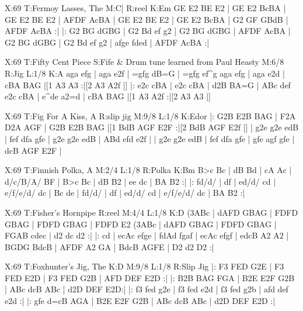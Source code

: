 \documentclass{article}
\begin{document}
\begin{abc}[name]
X:69
T:Fermoy Lasses, The
M:C|
R:reel
K:Em
GE E2 BE E2 | GE E2 BcBA | GE E2 BE E2 | AFDF AcBA |
GE E2 BE E2 | GE E2 BcBA | G2 GF GBdB | AFDF AcBA :|
|: G2 BG dGBG | G2 Bd ef g2 | G2 BG dGBG | AFDF AcBA |
G2 BG dGBG | G2 Bd ef g2 | afge fded | AFDF AcBA :|
\end{abc}

\begin{abc}[name]
X:69
T:Fifty Cent Piece
S:Fife & Drum tune learned from Paul Heasty
M:6/8
R:Jig
L:1/8
K:A
aga efg | aga e2f | =gfg dB=G | =gfg ef^g
aga efg | aga e2d | cBA BAG |[1 A3 A3 :|[2 A3 A2f |]
|: e2c cBA | e2c cBA | d2B BA=G | ABc def
e2c cBA | e^de a2=d | cBA BAG |[1 A3 A2f :|[2 A3 A3 |]
\end{abc}

\begin{abc}[name]
X:69
T:Fig For A Kiss, A
R:slip jig
M:9/8
L:1/8
K:Edor
|: G2B E2B BAG | F2A D2A AGF | G2B E2B BAG |[1 BdB AGF E2F :|[2 BdB AGF E2f |]
| g2e g2e edB | fef dfa gfe | g2e g2e edB | ABd efd e2f |
| g2e g2e edB | fef dfa gfe | gfe agf gfe | dcB AGF E2F |
\end{abc}

\begin{abc}[name]
X:69
T:Finnish Polka, A
M:2/4
L:1/8
R:Polka
K:Bm
B>c Bc | dB Bd | cA Ac | d/c/B/A/ BF |
B>c Bc | dB B2 | ee dc | BA B2 :|
|: fd/d/ | df | ed/d/ cd | e/f/e/d/ dc | Bc de |
fd/d/ | df | ed/d/ cd | e/f/e/d/ dc | BA B2 :|
\end{abc}

\begin{abc}[name]
X:69
T:Fisher's Hornpipe
R:reel
M:4/4
L:1/8
K:D
(3ABc | dAFD GBAG | FDFD GBAG | FDFD GBAG | FDFD E2 (3ABc |
dAFD GBAG | FDFD GBAG | FGAB cdec | d2 dc d2 :|
|: cd | ecAc efge | fdAd fgaf | ecAc efgf | edcB A2 A2 |
BGDG BdcB | AFDF A2 GA |  BdcB  AGFE | D2 d2 D2 :|
\end{abc}

\begin{abc}[name]
X:69
T:Foxhunter's Jig, The
K:D
M:9/8
L:1/8
R:Slip Jig
|: F3 FED G2E | F3 FED E2D | F3 FED G2B | AFD DEF E2D :|
|: B2B BAG FGA | B2E E2F G2B | ABc dcB ABc | d2D DEF E2D:|
|: f3 fed g2e | f3 fed e2d | f3 fed g2b | afd def e2d :|
|: gfe d=cB AGA | B2E E2F G2B | ABc dcB ABc | d2D DEF E2D :|
\end{abc}
\end{document}
